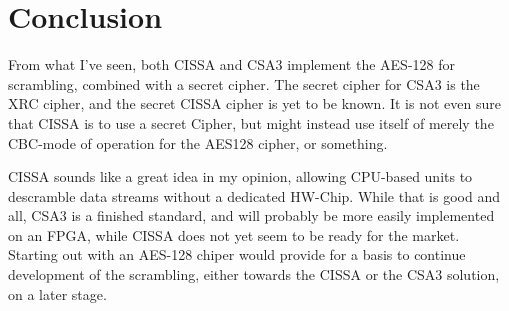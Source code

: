 \section{Conclusion}
From what I've seen, both CISSA and CSA3 implement the AES-128 for scrambling, 
combined with a secret cipher. The secret cipher for CSA3 is the XRC cipher, and 
the secret CISSA cipher is yet to be known. It is not even sure that CISSA is to 
use a secret Cipher, but might instead use itself of merely the CBC-mode of 
operation for the AES128 cipher, or something. 

CISSA sounds like a great idea in my opinion, allowing CPU-based units to 
descramble data streams without a dedicated HW-Chip. While that is good and all, 
CSA3 is a finished standard, and will probably be more easily implemented on an 
FPGA, while CISSA does not yet seem to be ready for the market. Starting out 
with an AES-128 chiper would provide for a basis to continue development of the 
scrambling, either towards the CISSA or the CSA3 solution, on a later stage.
